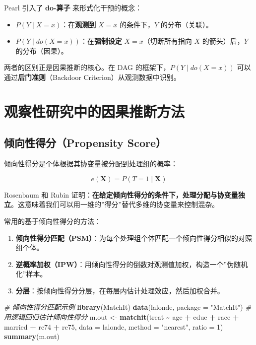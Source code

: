 \documentclass[
]{book}
\newenvironment{Shaded}{\begin{snugshade}}{\end{snugshade}}
\newcommand{\AttributeTok}[1]{\textcolor[rgb]{0.13,0.29,0.53}{#1}}
\newcommand{\CommentTok}[1]{\textcolor[rgb]{0.56,0.35,0.01}{\textit{#1}}}
\newcommand{\DecValTok}[1]{\textcolor[rgb]{0.00,0.00,0.81}{#1}}
\newcommand{\FunctionTok}[1]{\textcolor[rgb]{0.13,0.29,0.53}{\textbf{#1}}}
\newcommand{\NormalTok}[1]{#1}
\newcommand{\OtherTok}[1]{\textcolor[rgb]{0.56,0.35,0.01}{#1}}
\newcommand{\SpecialCharTok}[1]{\textcolor[rgb]{0.81,0.36,0.00}{\textbf{#1}}}
\newcommand{\StringTok}[1]{\textcolor[rgb]{0.31,0.60,0.02}{#1}}
\providecommand{\tightlist}{%
  \setlength{\itemsep}{0pt}\setlength{\parskip}{0pt}}
\begin{document}
Pearl 引入了 \textbf{do-算子} 来形式化干预的概念：

\begin{itemize}
\tightlist
\item
  \(P(Y \mid X = x)\)：在\textbf{观测到} \(X = x\) 的条件下，\(Y\) 的分布（关联）。
\item
  \(P(Y \mid do(X = x))\)：在\textbf{强制设定} \(X = x\)（切断所有指向 \(X\) 的箭头）后，\(Y\) 的分布（因果）。
\end{itemize}

两者的区别正是因果推断的核心。在 DAG 的框架下，\(P(Y \mid do(X = x))\) 可以通过\textbf{后门准则}（Backdoor Criterion）从观测数据中识别。

\section{观察性研究中的因果推断方法}\label{ux89c2ux5bdfux6027ux7814ux7a76ux4e2dux7684ux56e0ux679cux63a8ux65adux65b9ux6cd5}

\subsection{倾向性得分（Propensity Score）}\label{ux503eux5411ux6027ux5f97ux5206propensity-score}

倾向性得分是个体根据其协变量被分配到处理组的概率：

\[e(\mathbf{X}) = P(T = 1 \mid \mathbf{X})\]

Rosenbaum 和 Rubin 证明：\textbf{在给定倾向性得分的条件下，处理分配与协变量独立}。这意味着我们可以用一维的''得分''替代多维的协变量来控制混杂。

常用的基于倾向性得分的方法：

\begin{enumerate}
\def\labelenumi{\arabic{enumi}.}
\tightlist
\item
  \textbf{倾向性得分匹配（PSM）}：为每个处理组个体匹配一个倾向性得分相似的对照组个体。
\item
  \textbf{逆概率加权（IPW）}：用倾向性得分的倒数对观测值加权，构造一个''伪随机化''样本。
\item
  \textbf{分层}：按倾向性得分分层，在每层内估计处理效应，然后加权合并。
\end{enumerate}

\begin{Shaded}
\begin{Highlighting}[]
\CommentTok{\# 倾向性得分匹配示例}
\FunctionTok{library}\NormalTok{(MatchIt)}
\FunctionTok{data}\NormalTok{(lalonde, }\AttributeTok{package =} \StringTok{"MatchIt"}\NormalTok{)}
\CommentTok{\# 用逻辑回归估计倾向性得分}
\NormalTok{m.out }\OtherTok{\textless{}{-}} \FunctionTok{matchit}\NormalTok{(treat }\SpecialCharTok{\textasciitilde{}}\NormalTok{ age }\SpecialCharTok{+}\NormalTok{ educ }\SpecialCharTok{+}\NormalTok{ race }\SpecialCharTok{+}\NormalTok{ married }\SpecialCharTok{+}\NormalTok{ re74 }\SpecialCharTok{+}\NormalTok{ re75,}
                 \AttributeTok{data =}\NormalTok{ lalonde, }\AttributeTok{method =} \StringTok{"nearest"}\NormalTok{, }\AttributeTok{ratio =} \DecValTok{1}\NormalTok{)}
\FunctionTok{summary}\NormalTok{(m.out)}
\end{Highlighting}
\end{Shaded}
\end{document}
